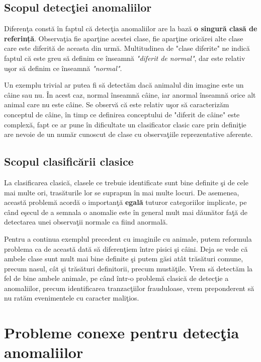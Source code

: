 \subsection{Scopul detecţiei anomaliilor}

Diferenţa constă în faptul că detecţia anomaliilor are la bază \textbf{o singură clasă
de referință}. Observaţia fie aparţine acestei clase, fie aparţine oricărei alte clase 
care este diferită de aceasta din urmă. Multitudinea de "clase diferite" ne indică
faptul că este greu să definim ce înseamnă \textit{"diferit de normal"}, dar este relativ uşor
să definim ce înseamnă \textit{"normal"}.

Un exemplu trivial ar putea fi să detectăm dacă animalul din imagine este un câine sau nu.
În acest caz, normal înseamnă câine, iar anormal înseamnă orice alt animal care nu este
câine. Se observă că este relativ uşor să caracterizăm conceptul de câine, în timp ce 
definirea conceptului de "diferit de câine" este complexă, fapt ce ar pune în dificultate
un clasificator clasic care prin definiţie are nevoie de un număr cunoscut de clase 
cu observaţiile reprezentative aferente.

\subsection{Scopul clasificării clasice}

La clasificarea clasică, clasele ce trebuie identificate sunt bine 
definite şi de cele mai multe ori, trasăturile lor se suprapun în mai multe locuri. De 
asemenea, această problemă acordă o importanţă \textbf{egală} tuturor categoriilor
implicate, pe când 
eşecul de a semnala o anomalie este în general mult mai dăunător faţă de 
detectarea unei observaţii normale ca fiind anormală. 

Pentru a continua exemplul precedent cu imaginile cu animale, putem reformula problema 
ca de această dată să diferenţiem între pisici şi câini. Deja se vede că ambele clase 
sunt mult mai bine definite şi putem găsi atât trăsături comune, precum nasul, cât şi 
trăsături definitorii, precum mustăţile. Vrem să detectăm la fel de bine ambele animale, 
pe când într-o problemă clasică de detecţie a anomaliilor, precum identificarea 
tranzacţiilor frauduloase, vrem preponderent să nu ratăm evenimentele cu 
caracter maliţios.

\section{Probleme conexe pentru detecţia anomaliilor}

